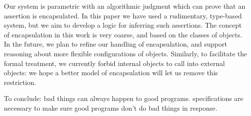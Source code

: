 Our  system is parametric with an algorithmic judgment which
can prove that an assertion is encapsulated. In this paper we have
used a rudimentary, type-based  system, but we aim to develop
a logic for inferring such assertions. The concept of encapsulation in
this work is very coarse, and based on the classes of objects. In the
future, we plan to refine our handling of encapsulation, and support
reasoning about more flexible configurations of objects.  Similarly,
to facilitate the formal treatment, we currently forbid internal
objects to call into external objects: we hope a better model of
encapsulation will let us remove this restriction.


To conclude: bad things can always happen to good programs. \Nec
specifications are necessary to make sure good programs don't do bad
things in response.
